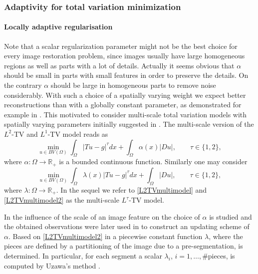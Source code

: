 \documentclass[enabledeprecatedfontcommands,cleardoublepage=empty,headsepline,twoside,11pt,DIV=15,BCOR=12mm,final]{scrartcl}
\newcommand{\R}{{\mathbb R}}
\begin{document}
\subsubsection{Adaptivity for total variation minimization}

\paragraph{Locally adaptive regularisation}\label{Sec:LocallyAdaptiveRegularization}

Note that a scalar regularization parameter might not be the best choice for every image restoration problem, since images usually have large homogeneous regions as well as parts with a lot of details. Actually it seems obvious that $\alpha$ should be small in parts with small features in order to preserve the details. On the contrary $\alpha$ should be large in homogeneous parts to remove noise considerably. With such a choice of a spatially varying weight we expect better reconstructions than with a globally constant parameter, as demonstrated for example in \cite{DoHiRi:11, HintermullerRincon-Camacho:10}. This motivated to consider multi-scale total variation models with spatially varying parameters initially suggested in \cite{RudinOsher:94}. The multi-scale version of the $L^2$-TV and $L^1$-TV model reads as
\begin{equation}\label{L2TVmultimodel}
\min_{u\in BV(\Omega)}  \int_\Omega |Tu-g|^\tau dx + \int_\Omega \alpha(x) |Du|, \qquad \tau\in \{1,2\},
\end{equation}
where $\alpha: \Omega \to \R_+$ is a bounded continuous function. Similarly one may consider
\begin{equation}\label{L2TVmultimodel2}
\min_{u\in BV(\Omega)} \int_\Omega \lambda(x) |Tu-g|^\tau dx +  \int_\Omega |Du|, \qquad \tau\in \{1,2\},
\end{equation}
where $\lambda: \Omega \to \R_+$. In the sequel we refer to \eqref{L2TVmultimodel} and \eqref{L2TVmultimodel2} as the multi-scale $L^\tau$-TV model.

In \cite{StrongChan:96} the influence of the scale of an image feature on the choice of $\alpha$ is studied and the obtained observations were later used in \cite{StBlCh:97} to construct an updating scheme of $\alpha$. Based on \eqref{L2TVmultimodel2} in \cite{BeCaRoSo:03} a piecewise constant function $\lambda$, where the pieces are defined by a partitioning of the image due to a pre-segmentation, is determined. In particular, for each segment a scalar $\lambda_i$, $i=1,\ldots,\#$pieces, is computed by Uzawa's method \cite{Ciarlet:89}.
\end{document}
